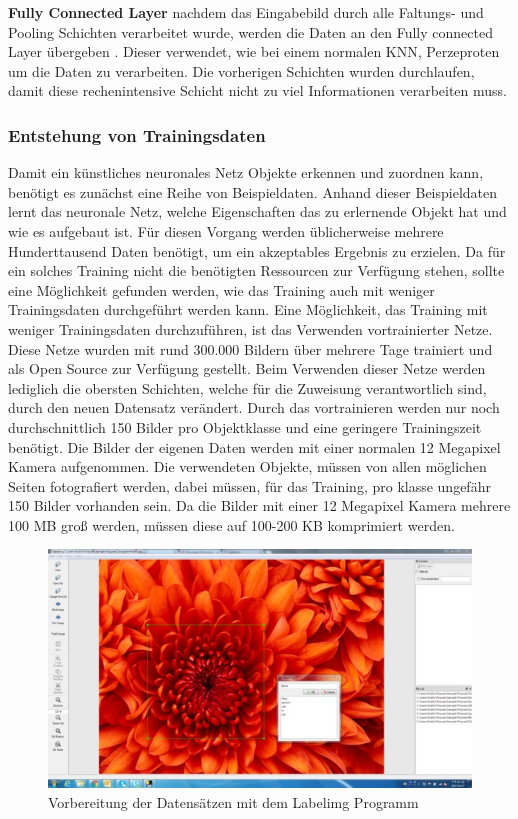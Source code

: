 \documentclass[a4paper,12pt,oneside]{article}
\begin{document}
\textbf{Fully Connected Layer}
nachdem das Eingabebild durch alle Faltungs- und Pooling Schichten verarbeitet wurde, werden die Daten an den Fully connected Layer übergeben \cite[14]{sermanet2012convolutional}. Dieser verwendet, wie bei einem normalen KNN, Perzeproten um die Daten zu verarbeiten. Die vorherigen Schichten wurden durchlaufen, damit diese rechenintensive Schicht nicht zu viel Informationen verarbeiten muss. 
  \subsubsection{Entstehung von Trainingsdaten}\label{s.trainingsdaten}
Damit ein künstliches neuronales Netz Objekte erkennen und zuordnen kann, benötigt es zunächst eine Reihe von Beispieldaten. Anhand dieser Beispieldaten lernt das neuronale Netz, welche Eigenschaften das zu erlernende Objekt hat und wie es aufgebaut ist. Für diesen Vorgang werden üblicherweise mehrere Hunderttausend Daten benötigt, um ein akzeptables Ergebnis zu erzielen. Da für ein solches Training nicht die benötigten Ressourcen zur Verfügung stehen, sollte eine Möglichkeit gefunden werden, wie das Training auch mit weniger Trainingsdaten durchgeführt werden kann.
Eine Möglichkeit, das Training mit weniger Trainingsdaten durchzuführen, ist das Verwenden vortrainierter Netze. Diese Netze wurden mit rund 300.000 Bildern über mehrere Tage trainiert und als Open Source zur Verfügung gestellt. Beim Verwenden dieser Netze werden lediglich die obersten Schichten, welche für die Zuweisung verantwortlich sind, durch den neuen Datensatz verändert. Durch das vortrainieren werden nur noch durchschnittlich 150 Bilder pro Objektklasse und eine geringere Trainingszeit benötigt. Die Bilder der eigenen Daten werden mit einer normalen 12 Megapixel Kamera aufgenommen. Die verwendeten Objekte, müssen von allen möglichen Seiten fotografiert werden, dabei müssen, für das Training, pro klasse ungefähr 150 Bilder vorhanden sein. Da die Bilder mit einer 12 Megapixel Kamera mehrere 100 MB groß werden, müssen diese auf 100-200 KB komprimiert werden. \\
\begin{figure}
	[h]
	\centering
	\includegraphics[scale=1.0]{Sources/labelimg.jpg}
	\caption{Vorbereitung der Datensätzen mit dem Labelimg Programm \cite{labelimg2019}}
	\label{img:labelimg}
\end{figure}\\
\end{document}
